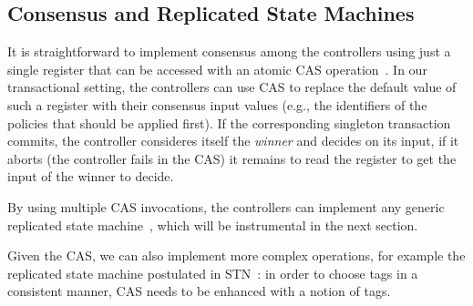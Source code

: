 \documentclass[conference]{sigcomm-alternate}
\begin{document}
\subsection{Consensus and Replicated State Machines}

It is straightforward to implement consensus among the controllers
using just a single register that can be accessed with an atomic CAS
operation~\cite{Her91}. In our transactional setting, the controllers
can use CAS to replace the default value of such a register
with their consensus input values (e.g., the identifiers of the
policies that should be applied first). If the corresponding
singleton transaction commits, the controller consideres itself
the \emph{winner} and decides on its input, if
it aborts (the controller fails in the CAS) it remains to read the register to get the input of the
winner to decide.

By using multiple CAS invocations, the controllers can implement any
generic replicated state machine~\cite{Her91,Lam98}, which will be instrumental in the
next section.

Given the CAS, we can also implement more complex operations,
for example the replicated state machine postulated in STN~\cite{stn}:
in order to choose tags in a consistent manner, CAS needs to be enhanced
with a notion of tags. 

%
%
%
\end{document}
